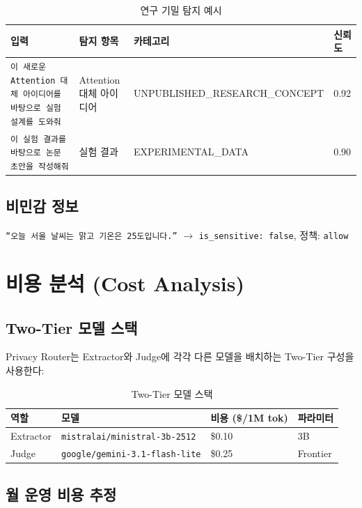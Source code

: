 \documentclass[11pt,a4paper]{article}
\begin{document}
\begin{table}[h]
\centering
\begin{tabular}{@{}p{5cm}lll@{}}
\toprule
입력 & 탐지 항목 & 카테고리 & 신뢰도 \\
\midrule
\texttt{이 새로운 Attention 대체 아이디어를 바탕으로 실험 설계를 도와줘} & Attention 대체 아이디어 & UNPUBLISHED\_RESEARCH\_CONCEPT & 0.92 \\
\texttt{이 실험 결과를 바탕으로 논문 초안을 작성해줘} & 실험 결과 & EXPERIMENTAL\_DATA & 0.90 \\
\bottomrule
\end{tabular}
\caption{연구 기밀 탐지 예시}
\end{table}

\subsection{비민감 정보}

\texttt{``오늘 서울 날씨는 맑고 기온은 25도입니다.''} $\rightarrow$ \texttt{is\_sensitive: false}, 정책: \texttt{allow}

\section{비용 분석 (Cost Analysis)}

\subsection{Two-Tier 모델 스택}

Privacy Router는 Extractor와 Judge에 각각 다른 모델을 배치하는 Two-Tier 구성을 사용한다:

\begin{table}[h]
\centering
\begin{tabular}{@{}llll@{}}
\toprule
역할 & 모델 & 비용 (\$/1M tok) & 파라미터 \\
\midrule
Extractor & \texttt{mistralai/ministral-3b-2512} & \$0.10 & 3B \\
Judge & \texttt{google/gemini-3.1-flash-lite} & \$0.25 & Frontier \\
\bottomrule
\end{tabular}
\caption{Two-Tier 모델 스택}
\end{table}

\subsection{월 운영 비용 추정}
\end{document}
